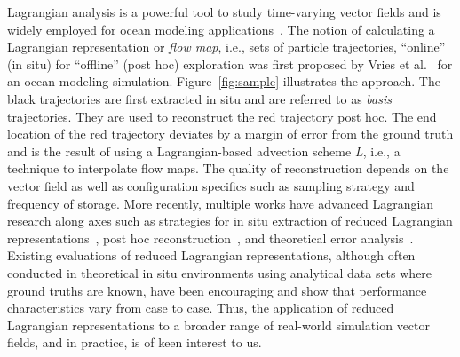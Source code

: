 %
Lagrangian analysis is a powerful tool to study time-varying vector fields and is widely employed for ocean modeling applications~\cite{VANSEBILLE201849}.
%
The notion of calculating a Lagrangian representation or \textit{flow map}, i.e., sets of particle trajectories, ``online'' (in situ) for ``offline'' (post hoc) exploration was first proposed by Vries et al.~\cite{vries2001calculating} for an ocean modeling simulation.
%
Figure~\ref{fig:sample} illustrates the approach.
%
The black trajectories are first extracted in situ and are referred to as \textit{basis} trajectories.
%
They are used to reconstruct the red trajectory post hoc.
%
The end location of the red trajectory deviates by a margin of error from the ground truth and is the result of using a Lagrangian-based advection scheme \textit{L}, i.e., a technique to interpolate flow maps.
%
The quality of reconstruction depends on the vector field as well as configuration specifics such as sampling strategy and frequency of storage. 
%
More recently, multiple works have advanced Lagrangian research along axes such as strategies for in situ extraction of reduced Lagrangian representations~\cite{agranovsky2014improved}\cite{rapp2019void}\cite{sane2020scalable}, post hoc reconstruction~\cite{chandler2015interpolation}\cite{sane2019interpolation}\cite{Jakob20}, and theoretical error analysis~\cite{bujack2015lagrangian}\cite{chandler2016analysis}\cite{hummel2016error}.
%
%
Existing evaluations of reduced Lagrangian representations, although often conducted in theoretical in situ environments using analytical data sets where ground truths are known, have been encouraging and show that performance characteristics vary from case to case. 
%
%
Thus, the application of reduced Lagrangian representations to a broader range of real-world simulation vector fields, and in practice, is of keen interest to us.
